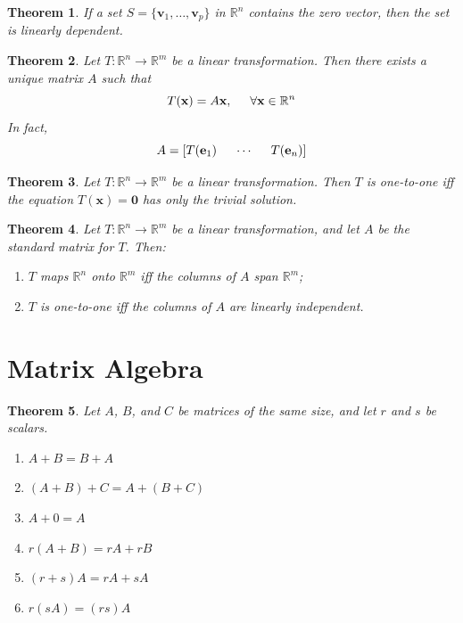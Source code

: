 \documentclass{article}
\theoremstyle{plain}
\newtheorem{thm}{Theorem}[section]
\theoremstyle{definition}
\theoremstyle{remark}
\begin{document}
\begin{thm}
    If a set $S=\{\textbf{v}_1,\ldots,\textbf{v}_p\}$ in $\mathbb{R}^n$ contains the zero vector, then the set is linearly dependent.
\end{thm}

\begin{thm}
    Let $T:\mathbb{R}^n\to\mathbb{R}^m$ be a linear transformation. Then there exists a unique matrix $A$ such that $$T(\textbf{x})=A\textbf{x},\hspace{.5cm}\forall\textbf{x}\in\mathbb{R}^n$$ In fact, $$A=[T(\textbf{e}_1)\hspace{.5cm}\cdots\hspace{.5cm}T(\textbf{e}_n)]$$    
\end{thm}

\begin{thm}
    Let $T:\mathbb{R}^n\to\mathbb{R}^m$ be a linear transformation. Then $T$ is one-to-one iff the equation $T(\textbf{x})=\textbf{0}$ has only the trivial solution.
\end{thm}

\begin{thm}
    Let $T:\mathbb{R}^n\to\mathbb{R}^m$ be a linear transformation, and let $A$ be the standard matrix for $T$. Then:
    \begin{enumerate}
        \item[a.] $T$ maps $\mathbb{R}^n$ onto $\mathbb{R}^m$ iff the columns of $A$ span $\mathbb{R}^m$;
        \item[b.] $T$ is one-to-one iff the columns of $A$ are linearly independent.
    \end{enumerate}
\end{thm}
    
\section{Matrix Algebra}

\begin{thm}
    Let $A$, $B$, and $C$ be matrices of the same size, and let $r$ and $s$ be scalars.
    \begin{enumerate}
        \item[a.] $A+B=B+A$
        \item[b.] $(A+B)+C=A+(B+C)$
        \item[c.] $A+0=A$
        \item[d.] $r(A+B)=rA+rB$
        \item[e.] $(r+s)A=rA+sA$
        \item[f.] $r(sA)=(rs)A$
    \end{enumerate}
\end{thm}
\end{document}

